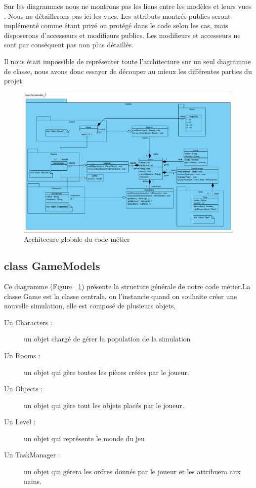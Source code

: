 \documentclass[a4paper]{report}
\begin{document}
Sur les diagrammes nous ne montrons pas les liens entre les \og modèles \fg et leurs \og vues \fg. Nous ne détaillerons pas ici les vues. Les attributs montrés publics seront implémenté comme étant privé ou protégé dans le code selon les cas, mais disposerons d'accesseurs et modifieurs publics. Les modifieurs et accesseurs ne sont par conséquent pas non plus détaillés.

Il nous était impossible de représenter toute l'architecture sur un seul diagramme de classe, nous avons donc essayer de découper au mieux les différentes parties du projet.

\begin{figure}
    \center
    \includegraphics[scale=0.5]{img/class/GameModels}
    \caption{Architecure globale du code métier}
		\label{GameModels}
\end{figure}

\subsection*{class GameModels\\}

Ce diagramme (Figure ~\ref{GameModels}) présente la structure générale de notre code métier.La classe Game est la classe centrale, on l'instancie quand on souhaite créer une nouvelle simulation, elle est composé de plusieurs objets.
\begin{description}
\item [Un \og Characters \fg :] un objet chargé de gérer la population de la simulation
\item [Un \og Rooms \fg :] un objet qui gère toutes les pièces créées par le joueur.
\item [Un \og Objects \fg :] un objet qui gère tout les objets placés par le joueur.
\item [Un \og Level \fg :] un objet qui représente le monde du jeu
\item [Un \og TaskManager \fg :] un objet qui gérera les ordres donnés par le joueur et les attribuera aux nains.
\end{description}
\end{document}
